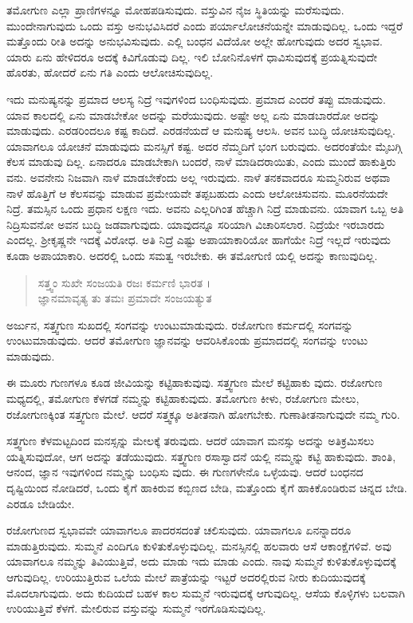 ತಮೋಗುಣ ಎಲ್ಲಾ ಪ್ರಾಣಿಗಳನ್ನೂ ಮೋಹಪಡಿಸುವುದು. ವಸ್ತುವಿನ ನೈಜ ಸ್ಥಿತಿಯನ್ನು ಮರೆಸುವುದು. ಮುಂದೇನಾಗುವುದು ಒಂದು ವಸ್ತು ಅನುಭವಿಸಿದರೆ ಎಂದು ಪರ್ಯಾಲೋಚನೆಯನ್ನೇ ಮಾಡುವುದಿಲ್ಲ. ಒಂದು ಇದ್ದರೆ ಮತ್ತೊಂದು ರೀತಿ ಅದನ್ನು ಅನುಭವಿಸುವುದು. ಎಲ್ಲಿ ಬಂಧನ ವಿದೆಯೋ ಅಲ್ಲೇ ಹೋಗುವುದು ಅದರ ಸ್ವಭಾವ. ಯಾರು ಏನು ಹೇಳಿದರೂ ಅದಕ್ಕೆ ಕಿವಿಗೊಡುವು ದಿಲ್ಲ. ಇಲಿ ಬೋನಿನೊಳಗೆ ಧಾವಿಸುವುದಕ್ಕೆ ಪ್ರಯತ್ನಿಸುವುದೇ ಹೊರತು, ಹೋದರೆ ಏನು ಗತಿ ಎಂದು ಆಲೋಚಿಸುವುದಿಲ್ಲ.

ಇದು ಮನುಷ್ಯನನ್ನು ಪ್ರಮಾದ ಆಲಸ್ಯ ನಿದ್ರೆ ಇವುಗಳಿಂದ ಬಂಧಿಸುವುದು. ಪ್ರಮಾದ ಎಂದರೆ ತಪ್ಪು ಮಾಡುವುದು. ಯಾವ ಕಾಲದಲ್ಲಿ ಏನು ಮಾಡಬೇಕೋ ಅದನ್ನು ಮರೆಯುವುದು. ಅಷ್ಟೇ ಅಲ್ಲ ಏನು ಮಾಡಬಾರದೋ ಅದನ್ನು ಮಾಡುವುದು. ಎರಡರಿಂದಲೂ ಕಷ್ಟ ಕಾದಿದೆ. ಎರಡನೆಯದೆ ಆ ಮನುಷ್ಯ ಆಲಸಿ. ಅವನ ಬುದ್ಧಿ ಯೋಚಿಸುವುದಿಲ್ಲ. ಯಾವಾಗಲೂ ಯೋಚನೆ ಮಾಡುವುದು ಮನಸ್ಸಿಗೆ ಕಷ್ಟ. ಅದರ ನೆಮ್ಮದಿಗೆ ಭಂಗ ಬರುವುದು. ಅದರಂತೆಯೇ ಮೈಬಗ್ಗಿ ಕೆಲಸ ಮಾಡುವು ದಿಲ್ಲ. ಏನಾದರೂ ಮಾಡಬೇಕಾಗಿ ಬಂದರೆ, ನಾಳೆ ಮಾಡಿದರಾಯಿತು, ಎಂದು ಮುಂದೆ ಹಾಕುತ್ತಿರು ವನು. ಅವನೇನು ನಿಜವಾಗಿ ನಾಳೆ ಮಾಡಬೇಕೆಂದು ಅಲ್ಲ ಇರುವುದು. ನಾಳೆ ತನಕವಾದರೂ ಸುಮ್ಮನಿರುವ ಅಥವಾ ನಾಳೆ ಹೊತ್ತಿಗೆ ಆ ಕೆಲಸವನ್ನು ಮಾಡುವ ಪ್ರಮೇಯವೇ ತಪ್ಪಬಹುದು ಎಂದು ಆಲೋಚಿಸುವನು. ಮೂರನೆಯದೇ ನಿದ್ರೆ. ತಮಸ್ಸಿನ ಒಂದು ಪ್ರಧಾನ ಲಕ್ಷಣ ಇದು. ಅವನು ಎಲ್ಲರಿಗಿಂತ ಹೆಚ್ಚಾಗಿ ನಿದ್ರೆ ಮಾಡುವನು. ಯಾವಾಗ ಒಬ್ಬ ಅತಿ ನಿದ್ರಿಸುವನೋ ಅವನ ಬುದ್ಧಿ ಜಡವಾಗುವುದು. ಯಾವುದನ್ನೂ ಸರಿಯಾಗಿ ವಿಚಾರಿಸಲಾರ. ನಿದ್ರೆಯೇ ಇರಬಾರದು ಎಂದಲ್ಲ. ಶ್ರೀಕೃಷ್ಣನೇ ಇದಕ್ಕೆ ವಿರೋಧ. ಅತಿ ನಿದ್ರೆ ಎಷ್ಟು ಅಪಾಯಾಕಾರಿಯೋ ಹಾಗೆಯೇ ನಿದ್ರೆ ಇಲ್ಲದೆ ಇರುವುದು ಕೂಡಾ ಅಪಾಯಾಕಾರಿ. ಅದರಲ್ಲಿ ಒಂದು ಸಮತ್ವ ಇರಬೇಕು. ಈ ತಮೋಗುಣಿ ಯಲ್ಲಿ ಅದನ್ನು ಕಾಣುವುದಿಲ್ಲ.

\begin{verse}
ಸತ್ತ್ವಂ ಸುಖೇ ಸಂಜಯತಿ ರಜಃ ಕರ್ಮಣಿ ಭಾರತ ।\\ಜ್ಞಾನಮಾವೃತ್ಯ ತು ತಮಃ ಪ್ರಮಾದೇ ಸಂಜಯತ್ಯುತ 
\end{verse}

{\small ಅರ್ಜುನ, ಸತ್ತ್ವಗುಣ ಸುಖದಲ್ಲಿ ಸಂಗವನ್ನು ಉಂಟುಮಾಡುವುದು. ರಜೋಗುಣ ಕರ್ಮದಲ್ಲಿ ಸಂಗವನ್ನು ಉಂಟುಮಾಡುವುದು. ಆದರೆ ತಮೋಗುಣ ಜ್ಞಾನವನ್ನು ಆವರಿಸಿಕೊಂಡು ಪ್ರಮಾದದಲ್ಲಿ ಸಂಗವನ್ನು ಉಂಟು ಮಾಡುವುದು.}

ಈ ಮೂರು ಗುಣಗಳೂ ಕೂಡ ಜೀವಿಯನ್ನು ಕಟ್ಟಿಹಾಕುವುವು. ಸತ್ತ್ವಗುಣ ಮೇಲೆ ಕಟ್ಟಿಹಾಕು ವುದು. ರಜೋಗುಣ ಮಧ್ಯದಲ್ಲಿ, ತಮೋಗುಣ ಕೆಳಗಡೆ ನಮ್ಮನ್ನು ಕಟ್ಟಿಹಾಕುವುದು. ತಮೋಗುಣ ಕೀಳು, ರಜೋಗುಣ ಮೇಲು, ರಜೋಗುಣಕ್ಕಿಂತ ಸತ್ತ್ವಗುಣ ಮೇಲೆ. ಆದರೆ ಸತ್ತ್ವಕ್ಕೂ ಅತೀತನಾಗಿ ಹೋಗಬೇಕು. ಗುಣಾತೀತನಾಗುವುದೇ ನಮ್ಮ ಗುರಿ.

ಸತ್ತ್ವಗುಣ ಕೆಳಮಟ್ಟದಿಂದ ಮನಸ್ಸನ್ನು ಮೇಲಕ್ಕೆ ತರುವುದು. ಆದರೆ ಯಾವಾಗ ಮನಸ್ಸು ಅದನ್ನು ಅತಿಕ್ರಮಿಸಲು ಯತ್ನಿಸುವುದೋ, ಆಗ ಅದನ್ನು ತಡೆಯುವುದು. ಸತ್ತ್ವಗುಣ ರಸಾಸ್ವಾದನೆ ಯಲ್ಲಿ ನಮ್ಮನ್ನು ಕಟ್ಟಿ ಹಾಕುವುದು. ಶಾಂತಿ, ಆನಂದ, ಜ್ಞಾನ ಇವುಗಳಿಂದ ನಮ್ಮನ್ನು ಬಂಧಿಸು ವುದು. ಈ ಗುಣಗಳೇನೊ ಒಳ್ಳೆಯವು. ಆದರೆ ಬಂಧನದ ದೃಷ್ಟಿಯಿಂದ ನೋಡಿದರೆ, ಒಂದು ಕೈಗೆ ಹಾಕಿರುವ ಕಬ್ಬಿಣದ ಬೇಡಿ, ಮತ್ತೊಂದು ಕೈಗೆ ಹಾಕಿಕೊಂಡಿರುವ ಚಿನ್ನದ ಬೇಡಿ. ಎರಡೂ ಬೇಡಿಯೇ.

ರಜೋಗುಣದ ಸ್ವಭಾವವೇ ಯಾವಾಗಲೂ ಪಾದರಸದಂತೆ ಚಲಿಸುವುದು. ಯಾವಾಗಲೂ ಏನನ್ನಾದರೂ ಮಾಡುತ್ತಿರುವುದು. ಸುಮ್ಮನೆ ಎಂದಿಗೂ ಕುಳಿತುಕೊಳ್ಳುವುದಿಲ್ಲ. ಮನಸ್ಸಿನಲ್ಲಿ ಹಲವಾರು ಆಸೆ ಆಕಾಂಕ್ಷೆಗಳಿವೆ. ಅವು ಯಾವಾಗಲೂ ನಮ್ಮನ್ನು ತಿವಿಯುತ್ತಿವೆ, ಅದು ಮಾಡು ಇದು ಮಾಡು ಎಂದು. ನಾವು ಸುಮ್ಮನೆ ಕುಳಿತುಕೊಳ್ಳುವುದಕ್ಕೆ ಆಗುವುದಿಲ್ಲ. ಉರಿಯುತ್ತಿರುವ ಒಲೆಯ ಮೇಲೆ ಪಾತ್ರೆಯನ್ನು ಇಟ್ಟರೆ ಅದರಲ್ಲಿರುವ ನೀರು ಕುದಿಯುವುದಕ್ಕೆ ಮೊದಲಾಗುವುದು. ಅದು ಕುದಿಯದೆ ಬಹಳ ಕಾಲ ಸುಮ್ಮನೆ ಇರುವುದಕ್ಕೆ ಆಗುವುದಿಲ್ಲ. ಆಸೆಯ ಕೊಳ್ಳಿಗಳು ಬಲವಾಗಿ ಉರಿಯುತ್ತಿವೆ ಕೆಳಗೆ. ಮೇಲಿರುವ ವಸ್ತುವನ್ನು ಸುಮ್ಮನೆ ಇರಗೊಡಿಸುವುದಿಲ್ಲ.

